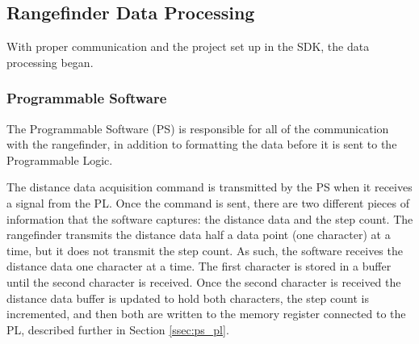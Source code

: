 \subsection{Rangefinder Data Processing}
With proper communication and the project set up in the SDK, the data processing began.

\subsubsection{Programmable Software}
The Programmable Software (PS) is responsible for all of the communication with the rangefinder, in addition to formatting the data before it is sent to the Programmable Logic.
\par
The distance data acquisition command is transmitted by the PS when it receives a signal from the PL. Once the command is sent, there are two different pieces of information that the software captures: the distance data and the step count. The rangefinder transmits the distance data half a data point (one character) at a time, but it does not transmit the step count. As such, the software receives the distance data one character at a time. The first character is stored in a buffer until the second character is received. Once the second character is received the distance data buffer is updated to hold both characters, the step count is incremented, and then both are written to the memory register connected to the PL, described further in Section \ref{ssec:ps_pl}.

